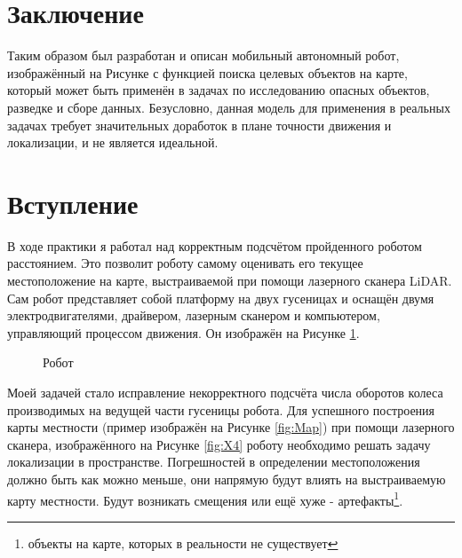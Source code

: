 \documentclass[12pt,a4paper]{scrartcl}
\begin{document}
			\section*{Заключение}
				Таким образом был разработан и описан мобильный автономный робот, изображённый на Рисунке с функцией поиска целевых объектов на карте, который может быть применён в задачах по исследованию опасных объектов, разведке и сборе данных. Безусловно, данная модель для применения в реальных задачах требует значительных доработок в плане точности движения и локализации, и не является идеальной.
					
						
		\section*{Вступление}
			В ходе практики я работал над корректным подсчётом пройденного роботом расстоянием. Это позволит роботу самому оценивать его текущее местоположение на карте, выстраиваемой при помощи лазерного сканера LiDAR. Сам робот представляет собой платформу на двух гусеницах и оснащён двумя электродвигателями, драйвером, лазерным сканером и компьютером, управляющий процессом движения. Он изображён на Рисунке \ref{fig:Robot}.
			
			\begin{figure}[h]
				\caption{Робот}
				\label{fig:Robot}
			\end{figure}
			
			Моей задачей стало исправление некорректного подсчёта числа оборотов колеса производимых на ведущей части гусеницы робота. Для успешного построения карты местности (пример изображён на Рисунке \ref{fig:Map}) при помощи лазерного сканера, изображённого на Рисунке \ref{fig:X4} роботу необходимо решать задачу локализации в пространстве. Погрешностей в определении местоположения должно быть как можно меньше, они напрямую будут влиять на выстраиваемую карту местности. Будут возникать смещения или ещё хуже - артефакты\footnote{объекты на карте, которых в реальности не существует}.
			
\end{document}
